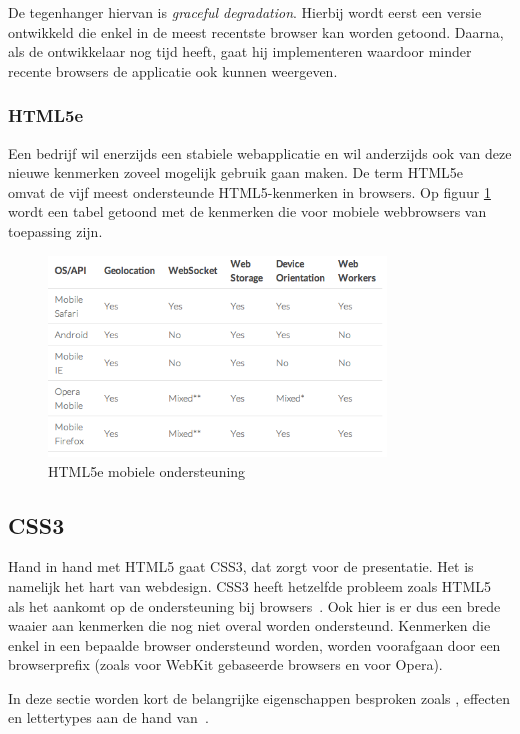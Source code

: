 De tegenhanger hiervan is \emph{graceful degradation}. 
Hierbij wordt eerst een versie ontwikkeld die enkel in de meest recentste browser kan worden getoond. 
Daarna, als de ontwikkelaar nog tijd heeft, gaat hij  implementeren waardoor minder recente browsers de applicatie ook kunnen weergeven.

\subsubsection{HTML5e}
Een bedrijf wil enerzijds een stabiele webapplicatie en wil anderzijds ook van deze nieuwe kenmerken zoveel mogelijk gebruik gaan maken. 
De term HTML5e~\cite{Hales2012} omvat de vijf meest ondersteunde HTML5-kenmerken in browsers. 
Op figuur \ref{fig:html5e} wordt een tabel getoond met de kenmerken die voor mobiele webbrowsers van toepassing zijn.

\begin{figure}
  \centering
  \includegraphics[width=0.8\textwidth]{figuren/html5e}
  \caption{HTML5e mobiele ondersteuning~\cite{Hales2012}}
  \label{fig:html5e}
\end{figure}

\subsection{CSS3}
\label{ref:css3}
Hand in hand met HTML5 gaat CSS3, dat zorgt voor de presentatie. 
Het is namelijk het hart van webdesign. 
CSS3 heeft hetzelfde probleem zoals HTML5 als het aankomt op de ondersteuning bij browsers~\cite{MacDonald2011}. 
Ook hier is er dus een brede waaier aan kenmerken die nog niet overal worden ondersteund. 
Kenmerken die enkel in een bepaalde browser ondersteund worden, worden voorafgaan door een browserprefix (zoals  voor WebKit gebaseerde browsers en  voor Opera).

In deze sectie worden kort de belangrijke eigenschappen besproken zoals , effecten en lettertypes aan de hand van~\cite{MacDonald2011}.

